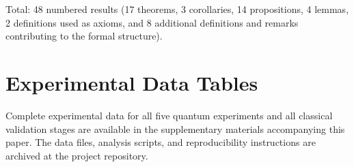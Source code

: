 \documentclass[12pt]{article}
\theoremstyle{definition}
\theoremstyle{remark}
\begin{document}
Total: 48 numbered results (17 theorems, 3 corollaries, 14 propositions, 4 lemmas, 2 definitions used as axioms, and 8 additional definitions and remarks contributing to the formal structure).


\section{Experimental Data Tables}
\label{app:data}

Complete experimental data for all five quantum experiments and all classical validation stages are available in the supplementary materials accompanying this paper. The data files, analysis scripts, and reproducibility instructions are archived at the project repository.
\end{document}
